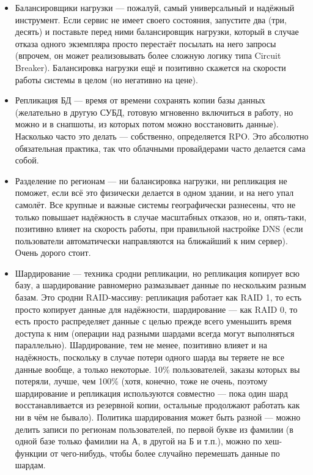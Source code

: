 \documentclass{../text-style}
\begin{document}
\begin{itemize}
    \item Балансировщики нагрузки --- пожалуй, самый универсальный и надёжный инструмент. Если сервис не имеет своего состояния, запустите два (три, десять) и поставьте перед ними балансировщик нагрузки, который в случае отказа одного экземпляра просто перестаёт посылать на него запросы (впрочем, он может реализовывать более сложную логику типа Circuit Breaker). Балансировка нагрузки ещё и позитивно скажется на скорости работы системы в целом (но негативно на цене).
    \item Репликация БД --- время от времени сохранять копии базы данных (желательно в другую СУБД, готовую мгновенно включиться в работу, но можно и в снапшоты, из которых потом можно восстановить данные). Насколько часто это делать --- собственно, определяется RPO. Это абсолютно обязательная практика, так что облачными провайдерами часто делается сама собой.
    \item Разделение по регионам --- ни балансировка нагрузки, ни репликация не поможет, если всё это физически делается в одном здании, и на него упал самолёт. Все крупные и важные системы географически разнесены, что не только повышает надёжность в случае масштабных отказов, но и, опять-таки, позитивно влияет на скорость работы, при правильной настройке DNS (если пользователи автоматически направляются на ближайший к ним сервер). Очень дорого стоит.
    \item Шардирование --- техника сродни репликации, но репликация копирует всю базу, а шардирование равномерно размазывает данные по нескольким разным базам. Это сродни RAID-массиву: репликация работает как RAID 1, то есть просто копирует данные для надёжности, шардирование --- как RAID 0, то есть просто распределяет данные с целью прежде всего уменьшить время доступа к ним (операции над разными шардами всегда могут выполняться параллельно). Шардирование, тем не менее, позитивно влияет и на надёжность, поскольку в случае потери одного шарда вы теряете не все данные вообще, а только некоторые. 10\% пользователей, заказы которых вы потеряли, лучше, чем 100\% (хотя, конечно, тоже не очень, поэтому шардирование и репликация используются совместно --- пока один шард восстанавливается из резервной копии, остальные продолжают работать как ни в чём не бывало). Политика шардирования может быть разной --- можно делить записи по регионам пользователей, по первой букве из фамилии (в одной базе только фамилии на А, в другой на Б и т.п.), можно по хеш-функции от чего-нибудь, чтобы более случайно перемешать данные по шардам.
\end{itemize}
\end{document}
